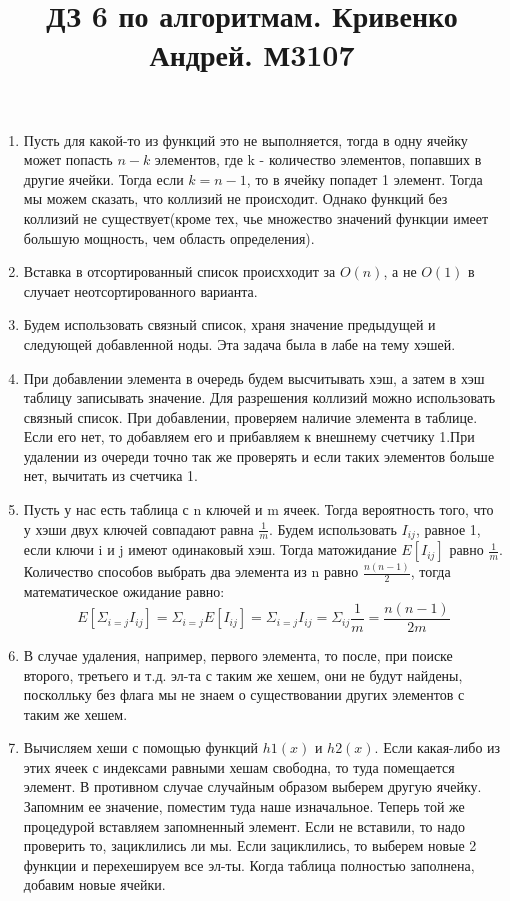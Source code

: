 \documentclass{article}
\title{ДЗ 6 по алгоритмам. Кривенко Андрей. М3107}
\begin{document}
\maketitle
\begin{enumerate}
  \item Пусть для какой-то из функций это не выполняется, тогда в одну ячейку может попасть $n-k$ элементов, где k - количество элементов, попавших в другие ячейки. Тогда если $k=n-1$, то в ячейку попадет 1 элемент. Тогда мы можем сказать, что коллизий не происходит. Однако функций без коллизий не существует(кроме тех, чье множество значений функции имеет большую мощность, чем область определения).
  \item Вставка в отсортированный список происхходит за $O(n)$, а не $O(1)$ в случает неотсортированного варианта.
  \item Будем использовать связный список, храня значение предыдущей и следующей добавленной ноды. Эта задача была в лабе на тему хэшей.
  \item При добавлении элемента в очередь будем высчитывать хэш, а затем в хэш таблицу записывать значение. Для разрешения коллизий можно использовать связный список. При добавлении, проверяем наличие элемента в таблице. Если его нет, то добавляем его и прибавляем к внешнему счетчику 1.При удалении из очереди точно так же проверять и если таких элементов больше нет, вычитать из счетчика 1.
  \item Пусть у нас есть таблица с n ключей и m ячеек. Тогда вероятность того, что у хэши двух ключей совпадают равна $\frac{1}{m}$. Будем использовать $I_{ij}$, равное 1, если ключи i и j имеют одинаковый хэш. Тогда матожидание $E[I_{ij}]$ равно $\frac{1}{m}$. Количество способов выбрать два элемента из n равно $\frac{n(n-1)}{2}$, тогда математическое ожидание равно: 
    \[ E[\Sigma_{i=j} I_{ij}] = \Sigma_{i=j} E[I_{ij}] = \Sigma_{i=j} I_{ij} = \Sigma_{ij} \frac{1}{m} = \frac{n(n-1)}{2m}\]
  \item В случае удаления, например, первого элемента, то после, при поиске второго, третьего и т.д. эл-та с таким же хешем, они не будут найдены, посколльку без флага мы не знаем о существовании других элементов с таким же хешем.
  \item Вычисляем хеши с помощью функций $h1(x)$ и  $h2(x)$. Если какая-либо из этих ячеек с индексами равными хешам свободна, то туда помещается элемент. В противном случае случайным образом выберем другую ячейку. Запомним ее значение, поместим туда наше изначальное. Теперь той же процедурой вставляем запомненный элемент. Если не вставили, то надо проверить то, зациклились ли мы. Если зациклились, то выберем новые 2 функции и перехешируем все эл-ты.  Когда таблица полностью заполнена, добавим новые ячейки.
\end{enumerate}
\end{document}
